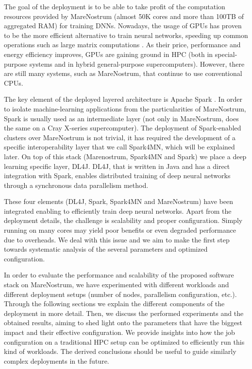 \documentclass[journal]{IEEEtran}
\begin{document}
The goal of the deployment is to be able to take profit of the computation resources provided by MareNostrum (almost 50K cores and more than 100TB of aggregated RAM) for training DNNs. Nowadays, the usage of GPUs has proven to be the more efficient alternative to train neural networks, speeding up common operations such as large matrix computations \cite{DBLP:conf/isca/LeeKCDKNSSCHSD10, conf/ipps/Fujimoto08}. As their price, performance and energy efficiency improves, GPUs are gaining ground in HPC (both in special-purpose systems and in hybrid general-purpose supercomputers). However, there are still many systems, such as MareNostrum, that continue to use conventional CPUs. 

The key element of the deployed layered architecture is Apache Spark \cite{spark}. In order to isolate machine-learning applications from the particularities of MareNostrum, Spark is usually used as an intermediate layer (not only in MareNostrum, \cite{wang2014} does the same on a Cray X-series supercomputer). The deployment of Spark-enabled clusters over MareNostrum is not trivial, it has required the development of a specific interoperability layer that we call Spark4MN, which will be explained later. On top of this stack (Marenostrum, Spark4MN and Spark) we place a deep learning specific layer, DL4J. DL4J, that is written in Java and has a direct integration with Spark, enables distributed training of deep neural networks through a synchronous data parallelism method. 

These four elements (DL4J, Spark, Spark4MN and MareNostrum) have been integrated enabling to efficiently train deep neural networks. Apart from the deployment details, the challenge is scalability and proper configuration. Simply running on many cores may yield poor benefits or even degraded performance due to overheads. We deal with this issue and we aim to make the first step towards systematic analysis of the several parameters and optimized configuration.

In order to evaluate the performance and scalability of the proposed software stack on MareNostrum, we have experimented with different workloads and different deployment setups (number of nodes, parallelism configuration, etc.). Through the following sections we explain the different components of the deployment in more detail. Then, we discuss the performed experiments and the obtained results, aiming to shed light onto the parameters that have the biggest impact and their effective configuration. We provide insights into how the job configuration on a traditional HPC setup can be optimized to efficiently run this kind of workloads. The derived conclusions should be useful to guide similarly complex deployments in the future.
\end{document}
